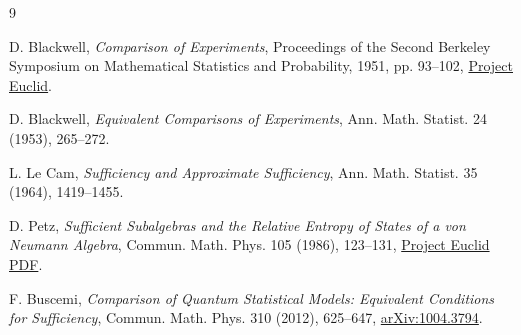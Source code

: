 \documentclass[12pt]{article}
\theoremstyle{remark}
\begin{document}
\begin{thebibliography}{9}

D. Blackwell,
\emph{Comparison of Experiments},
Proceedings of the Second Berkeley Symposium on Mathematical Statistics and
Probability, 1951, pp. 93--102,
\href{https://projecteuclid.org/euclid.bsmsp/1200500222}{Project Euclid}.

D. Blackwell,
\emph{Equivalent Comparisons of Experiments},
Ann. Math. Statist. 24 (1953), 265--272.

L. Le Cam,
\emph{Sufficiency and Approximate Sufficiency},
Ann. Math. Statist. 35 (1964), 1419--1455.

D. Petz,
\emph{Sufficient Subalgebras and the Relative Entropy of States of a von
Neumann Algebra},
Commun. Math. Phys. 105 (1986), 123--131,
\href{https://projecteuclid.org/journals/communications-in-mathematical-physics/volume-105/issue-1/Sufficient-subalgebras-and-the-relative-entropy-of-states/cmp/1104115260.pdf}{Project Euclid PDF}.

F. Buscemi,
\emph{Comparison of Quantum Statistical Models: Equivalent Conditions for
Sufficiency},
Commun. Math. Phys. 310 (2012), 625--647,
\href{https://arxiv.org/abs/1004.3794}{arXiv:1004.3794}.

\end{thebibliography}
\end{document}
